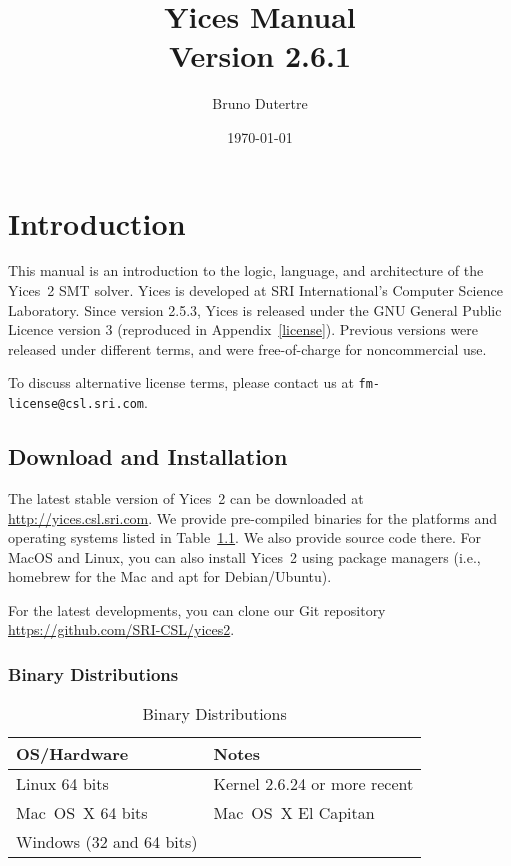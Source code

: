 \documentclass[11pt,twoside,fleqn,openright,titlepage]{cslreport}
\begin{document}
\begin{titlepage}
\date{\today}
\author{Bruno Dutertre}
\title{\textbf{Yices Manual\\[0.6em]
Version 2.6.1}}
\end{titlepage}

\maketitle
\cleardoublepageblank
\tableofcontents
\cleardoublepage
\setcounter{page}{0}


\chapter{Introduction}

This  manual   is  an  introduction   to  the  logic,   language,  and
architecture  of the  Yices~2 SMT  solver. Yices  is developed  at SRI
International's  Computer Science  Laboratory.   Since version  2.5.3,
Yices  is released  under the  GNU  General Public  Licence version  3
(reproduced  in   Appendix~\ref{license}).   Previous   versions  were
released   under  different   terms,  and   were  free-of-charge   for
noncommercial use.

To discuss alternative license terms, please contact us at
\texttt{fm-license@csl.sri.com}.


\section{Download and Installation}

The latest stable version of Yices~2 can be downloaded at
\url{http://yices.csl.sri.com}.  We provide pre-compiled binaries for
the platforms and operating systems listed in Table~\ref{versions}. We
also provide source code there. For MacOS and Linux, you can also
install Yices~2 using package managers (i.e., homebrew for the Mac and
apt for Debian/Ubuntu).

For the latest developments, you can clone our Git repository
\url{https://github.com/SRI-CSL/yices2}.


\subsection{Binary Distributions}

\begin{table}
\begin{center}
\renewcommand{\arraystretch}{1.1}
\begin{tabular}{|l|l|}
\hline
\textbf{OS/Hardware} & \textbf{Notes} \\
\hline
\hline
Linux 64 bits & Kernel 2.6.24 or more recent \\
\hline
Mac~OS~X 64 bits &  Mac~OS~X El Capitan\\
\hline
Windows (32 and 64 bits) & \\
\hline
\end{tabular}
\end{center}
\caption{Binary Distributions}
\label{versions}
\end{table}
\end{document}

